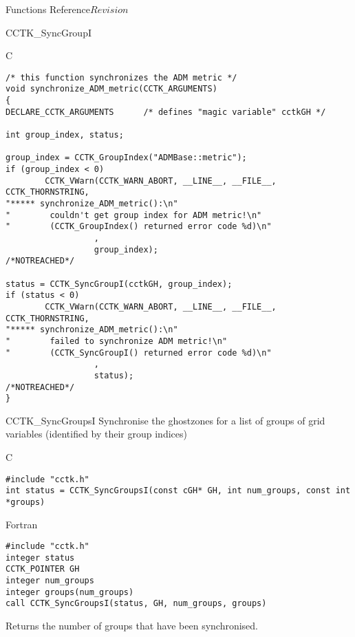 \begin{cactuspart}{ Functions Reference}{}{$Revision$}
\begin{FunctionDescription}{CCTK\_SyncGroupI}
\begin{ExampleSection}
\begin{Example}{C}
\begin{verbatim}
/* this function synchronizes the ADM metric */
void synchronize_ADM_metric(CCTK_ARGUMENTS)
{
DECLARE_CCTK_ARGUMENTS      /* defines "magic variable" cctkGH */

int group_index, status;

group_index = CCTK_GroupIndex("ADMBase::metric");
if (group_index < 0)
        CCTK_VWarn(CCTK_WARN_ABORT, __LINE__, __FILE__, CCTK_THORNSTRING,
"***** synchronize_ADM_metric():\n"
"        couldn't get group index for ADM metric!\n"
"        (CCTK_GroupIndex() returned error code %d)\n"
                  ,
                  group_index);                            /*NOTREACHED*/

status = CCTK_SyncGroupI(cctkGH, group_index);
if (status < 0)
        CCTK_VWarn(CCTK_WARN_ABORT, __LINE__, __FILE__, CCTK_THORNSTRING,
"***** synchronize_ADM_metric():\n"
"        failed to synchronize ADM metric!\n"
"        (CCTK_SyncGroupI() returned error code %d)\n"
                  ,
                  status);                                 /*NOTREACHED*/
}
\end{verbatim}
\end{Example}
\end{ExampleSection}
\end{FunctionDescription}



\begin{FunctionDescription}{CCTK\_SyncGroupsI}
\label{CCTK-SyncGroupsI}
Synchronise the ghostzones for a list of groups of grid variables
(identified by their group indices)

\begin{SynopsisSection}
\begin{Synopsis}{C}
\begin{verbatim}
#include "cctk.h"
int status = CCTK_SyncGroupsI(const cGH* GH, int num_groups, const int *groups)
\end{verbatim}
\end{Synopsis}
\begin{Synopsis}{Fortran}
\begin{verbatim}
#include "cctk.h"
integer status
CCTK_POINTER GH
integer num_groups
integer groups(num_groups)
call CCTK_SyncGroupsI(status, GH, num_groups, groups)
\end{verbatim}
\end{Synopsis}
\end{SynopsisSection}

\begin{ResultSection}
\begin{Result}{0}
Returns the number of groups that have been synchronised.
\end{Result}
\end{ResultSection}


\end{FunctionDescription}
\end{cactuspart}
